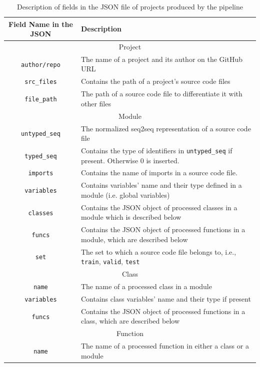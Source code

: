 \documentclass[10pt, conference]{IEEEtran}
\begin{document}
\begin{table}[!t]
	\centering
	\caption{Description of fields in the JSON file of projects produced by the pipeline}
	\label{tab:json-fields}
	\begin{tabular}{c l}
		\toprule
		Field Name in the JSON & Description \\
		\midrule
		\multicolumn{2}{c}{Project}  \\
		\midrule
		\texttt{author/repo} & The name of a project and its author on the GitHub URL  \\
		\midrule
		\texttt{src\_files} & Contains the path of a project's source code files \\
		\midrule
		\texttt{file\_path} & The path of a source code file to differentiate it with other files \\
		\midrule
		\multicolumn{2}{c}{Module}  \\
		\midrule
		\texttt{untyped\_seq} & The normalized seq2seq representation of a source code file \\
		\midrule
		\texttt{typed\_seq} & Contains the type of identifiers in \texttt{untyped\_seq} if present. Otherwise $0$ is inserted. \\
		\midrule
		\texttt{imports} & Contains the name of imports in a source code file. \\
		\midrule
		\texttt{variables} & Contains variables' name and their type defined in a module (i.e. global variables) \\
		\midrule
		\texttt{classes} & Contains the JSON object of processed classes in a module which is described below \\
		\midrule
		\texttt{funcs} &  Contains the JSON object of processed functions in a module, which are described below \\
		\midrule
		\texttt{set} & The set to which a source code file belongs to, i.e., \texttt{train}, \texttt{valid}, \texttt{test} \\
		\midrule
		\multicolumn{2}{c}{Class} \\
		\midrule
		\texttt{name} & The name of a processed class in a module \\
		\midrule
		\texttt{variables} & Contains class variables' name and their type if present \\
		\midrule
		\texttt{funcs} & Contains the JSON object of processed functions in a class, which are described below \\
		\midrule
		\multicolumn{2}{c}{Function} \\
		\midrule
		\texttt{name} & The name of a processed function in either a class or a module \\

\end{tabular}
\end{table}
\end{document}
